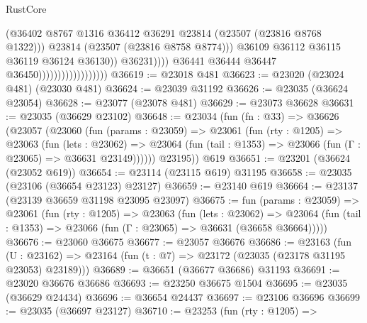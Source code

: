 \begin{lexlean}{RustCore}
\begin{coremodule}
                                                      (@36402
                                                        @8767
                                                        @1316
                                                        @36412
                                                        @36291
                                                        @23814
                                                        (@23507 (@23816 @8768 @1322)))
                                                      @23814
                                                      (@23507 (@23816 @8758 @8774)))
                                                    @36109
                                                    @36112
                                                    @36115
                                                    @36119
                                                    @36124
                                                    @36130))
                                                @36231))))
                                        @36441
                                        @36444
                                        @36447
                                        @36450))))))))))))))))))
@36619 := @23018 @481
@36623 := @23020 (@23024 @481) (@23030 @481)
@36624 := @23039 @31192
@36626 := @23035 (@36624 @23054)
@36628 := @23077 (@23078 @481)
@36629 := @23073 @36628
@36631 := @23035 (@36629 @23102)
@36648 := @23034
    (fun (fn : @33) =>
    @36626
      (@23057
        (@23060
          (fun (params : @23059) =>
          @23061
            (fun (rty : @1205) =>
            @23063
              (fun (lets : @23062) =>
              @23064 (fun (tail : @1353) => @23066 (fun (Γ : @23065) => @36631 @23149))))))
        @23195))
    @619
@36651 := @23201 (@36624 (@23052 @619))
@36654 := @23114 (@23115 @619) @31195
@36658 := @23035 (@23106 (@36654 @23123) @23127)
@36659 := @23140 @619
@36664 := @23137 (@23139 @36659 @31198 @23095 @23097)
@36675 := fun (params : @23059) =>
  @23061
    (fun (rty : @1205) =>
    @23063
      (fun (lets : @23062) =>
      @23064 (fun (tail : @1353) => @23066 (fun (Γ : @23065) => @36631 (@36658 @36664)))))
@36676 := @23060 @36675
@36677 := @23057 @36676
@36686 := @23163
    (fun (U : @23162) => @23164 (fun (t : @7) => @23172 (@23035 (@23178 @31195 @23053) @23189)))
@36689 := @36651 (@36677 @36686) @31193
@36691 := @23020 @36676 @36686
@36693 := @23250 @36675 @1504
@36695 := @23035 (@36629 @24434)
@36696 := @36654 @24437
@36697 := @23106 @36696
@36699 := @23035 (@36697 @23127)
@36710 := @23253
    (fun (rty : @1205) =>

\end{coremodule}
\end{lexlean}
